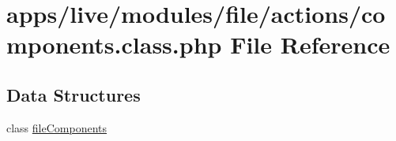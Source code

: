 \hypertarget{live_2modules_2file_2actions_2components_8class_8php}{\section{apps/live/modules/file/actions/components.class.\-php File Reference}
\label{live_2modules_2file_2actions_2components_8class_8php}
}
\subsection*{Data Structures}
\begin{DoxyCompactItemize}
\item 
class \hyperlink{classfile_components}{file\-Components}
\end{DoxyCompactItemize}
